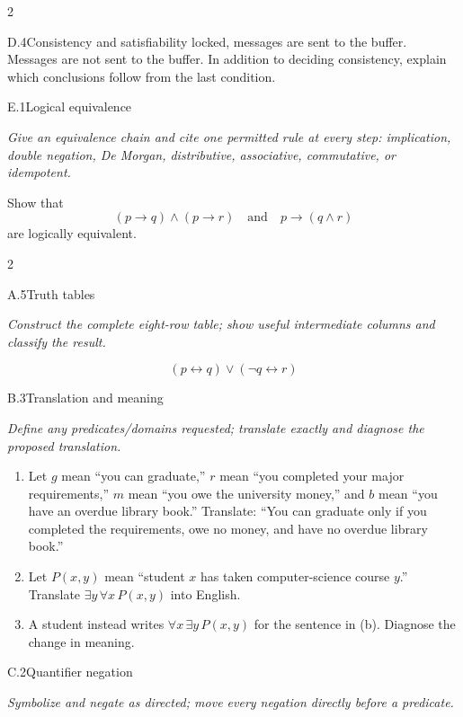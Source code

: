 \documentclass[9pt]{extarticle}
\begin{document}
\begin{multicols}{2}
\begin{CoreProblem}{D.4}{Consistency and satisfiability}
locked, messages are sent to the buffer. Messages are not sent to the buffer.
In addition to deciding consistency, explain which conclusions follow from the
last condition.
\end{CoreProblem}
\begin{CoreProblem}{E.1}{Logical equivalence}
{\scriptsize\textit{Give an equivalence chain and cite one permitted rule at every step: implication, double negation, De Morgan, distributive, associative, commutative, or idempotent.}\par}
Show that
\[
  (p\to q)\land(p\to r)
  \quad\text{and}\quad
  p\to(q\land r)
\]
are logically equivalent.
\end{CoreProblem}
\end{multicols}
\CoreWorkArea
\FormBreak
{}
\begin{multicols}{2}
\begin{CoreProblem}{A.5}{Truth tables}
{\scriptsize\textit{Construct the complete eight-row table; show useful intermediate columns and classify the result.}\par}
\[
  (p\leftrightarrow q)\lor(\neg q\leftrightarrow r)
\]
\end{CoreProblem}
\begin{CoreProblem}{B.3}{Translation and meaning}
{\scriptsize\textit{Define any predicates/domains requested; translate exactly and diagnose the proposed translation.}\par}
\begin{enumerate}[label=(\alph*)]
  \item Let $g$ mean ``you can graduate,'' $r$ mean ``you completed your major
        requirements,'' $m$ mean ``you owe the university money,'' and $b$
        mean ``you have an overdue library book.'' Translate: ``You can
        graduate only if you completed the requirements, owe no money, and
        have no overdue library book.''
  \item Let $P(x,y)$ mean ``student $x$ has taken computer-science course
        $y$.'' Translate $\exists y\,\forall x\,P(x,y)$ into English.
  \item A student instead writes $\forall x\,\exists y\,P(x,y)$ for the
        sentence in (b). Diagnose the change in meaning.
\end{enumerate}
\end{CoreProblem}
\begin{CoreProblem}{C.2}{Quantifier negation}
{\scriptsize\textit{Symbolize and negate as directed; move every negation directly before a predicate.}\par}

\end{CoreProblem}
\end{multicols}
\end{document}
